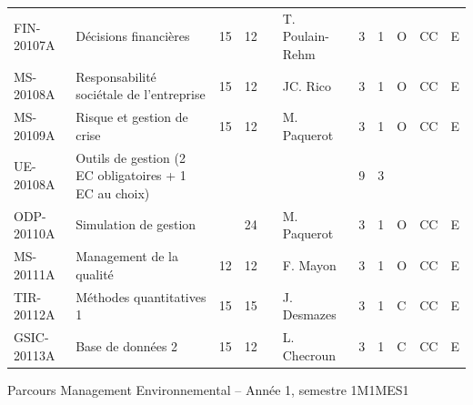 \documentclass[a4paper,11pt]{article}
\begin{document}
{{\begin{tabular}{lllllllllll}
FIN-20107A    & Décisions financières                                             & 15 & 12 &    & T. Poulain-Rehm & 3    & 1    & O           & CC             & E         \\
MS-20108A     & Responsabilité sociétale de l'entreprise                          & 15 & 12 &    & JC. Rico        & 3    & 1    & O           & CC             & E         \\
MS-20109A     & Risque et gestion de crise                                        & 15 & 12 &    & M. Paquerot     & 3    & 1    & O           & CC             & E         \\
\rowcolor[HTML]{C0C0C0} 
UE-20108A     & Outils de gestion (2 EC obligatoires + 1 EC au choix)             &    &    &    &                 & 9    & 3    &             &                &           \\
ODP-20110A    & Simulation de gestion                                             &    & 24 &    & M. Paquerot     & 3    & 1    & O           & CC             & E         \\
MS-20111A     & Management de la qualité                                          & 12 & 12 &    & F. Mayon        & 3    & 1    & O           & CC             & E         \\
TIR-20112A    & Méthodes quantitatives 1                                          & 15 & 15 &    & J. Desmazes     & 3    & 1    & C           & CC             & E         \\
GSIC-20113A   & Base de données 2                                                 & 15 & 12 &    & L. Checroun     & 3    & 1    & C           & CC             & E         
\end{tabular}}
}{Parcours Management Environnemental -- Année 1, semestre 1}{M1MES1}
\end{document}
